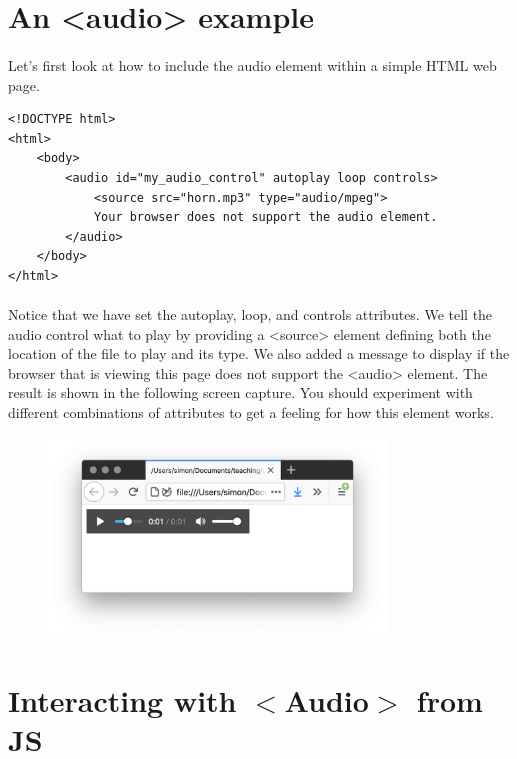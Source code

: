 \section{An <audio> example}

\paragraph{} Let's first look at how to include the audio element within a simple HTML web page. 

\begin{lstlisting}
<!DOCTYPE html>
<html>
    <body>
        <audio id="my_audio_control" autoplay loop controls>
            <source src="horn.mp3" type="audio/mpeg">
            Your browser does not support the audio element.
        </audio>
    </body>
</html>
\end{lstlisting}

\paragraph{} Notice that we have set the autoplay, loop, and controls attributes. We tell the audio control what to play by providing a <source> element defining both the location of the file to play and its type. We also added a message to display if the browser that is viewing this page does not support the <audio> element. The result is shown in the following screen capture. You should experiment with different combinations of attributes to get a feeling for how this element works.

\begin{figure}[H]
\centering
\includegraphics[width=0.8\textwidth]{figures/audio-ui}
\label{fig:audio-ui}
\caption{}
\end{figure}

\section{Interacting with $<$Audio$>$ from JS}
